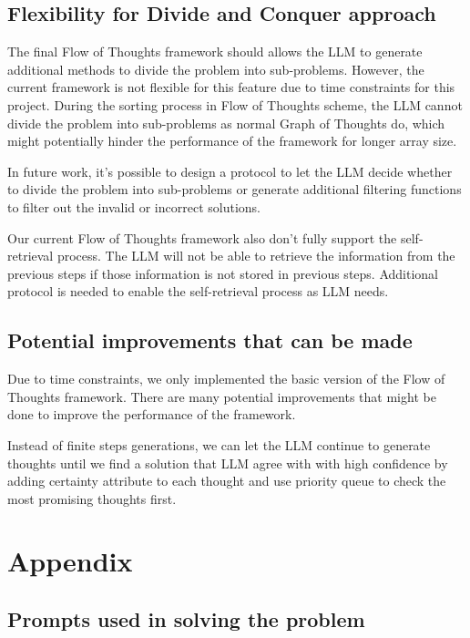 \documentclass{article}
\begin{document}
\subsection{Flexibility for Divide and Conquer approach}

The final Flow of Thoughts framework should allows the LLM to generate additional methods to divide the problem into sub-problems. However, the current framework is not flexible for this feature due to time constraints for this project. During the sorting process in Flow of Thoughts scheme, the LLM cannot divide the problem into sub-problems as normal Graph of Thoughts do, which might potentially hinder the performance of the framework for longer array size.

In future work, it's possible to design a protocol to let the LLM decide whether to divide the problem into sub-problems or generate additional filtering functions to filter out the invalid or incorrect solutions.

Our current Flow of Thoughts framework also don't fully support the self-retrieval process. The LLM will not be able to retrieve the information from the previous steps if those information is not stored in previous steps. Additional protocol is needed to enable the self-retrieval process as LLM needs.

\subsection{Potential improvements that can be made}
\label{sec:future_work_self_generation}

Due to time constraints, we only implemented the basic version of the Flow of Thoughts framework. There are many potential improvements that might be done to improve the performance of the framework.

Instead of finite steps generations, we can let the LLM continue to generate thoughts until we find a solution that LLM agree with with high confidence by adding certainty attribute \cite{lin2022teachingmodelsexpressuncertainty} to each thought and use priority queue to check the most promising thoughts first.

\medskip
{
\small
{}

}

\section{Appendix}

\subsection{Prompts used in solving the problem}
\end{document}
